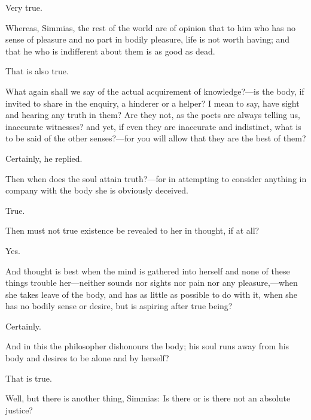 \documentclass[11pt,letter]{article}
\begin{document}
\par  Very true.

\par  Whereas, Simmias, the rest of the world are of opinion that to him who has no sense of pleasure and no part in bodily pleasure, life is not worth having; and that he who is indifferent about them is as good as dead.

\par  That is also true.

\par  What again shall we say of the actual acquirement of knowledge?—is the body, if invited to share in the enquiry, a hinderer or a helper? I mean to say, have sight and hearing any truth in them? Are they not, as the poets are always telling us, inaccurate witnesses? and yet, if even they are inaccurate and indistinct, what is to be said of the other senses?—for you will allow that they are the best of them?

\par  Certainly, he replied.

\par  Then when does the soul attain truth?—for in attempting to consider anything in company with the body she is obviously deceived.

\par  True.

\par  Then must not true existence be revealed to her in thought, if at all?

\par  Yes.

\par  And thought is best when the mind is gathered into herself and none of these things trouble her—neither sounds nor sights nor pain nor any pleasure,—when she takes leave of the body, and has as little as possible to do with it, when she has no bodily sense or desire, but is aspiring after true being?

\par  Certainly.

\par  And in this the philosopher dishonours the body; his soul runs away from his body and desires to be alone and by herself?

\par  That is true.

\par  Well, but there is another thing, Simmias: Is there or is there not an absolute justice?
\end{document}
